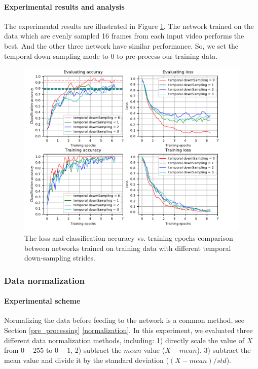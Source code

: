 \paragraph{Experimental results and  analysis}
The experimental results are illustrated in Figure \ref{fig:plot_tds}. The network trained on the data which are evenly sampled 16 frames from each input video performs the best. And the other three network have similar performance. So, we set the temporal down-sampling mode to 0 to pre-process our training data.
\begin{figure}
	\includegraphics[trim=0cm 0cm 0cm 0cm]{fig01/plot_tds.pdf}
	\caption{The loss and classification accuracy vs. training epochs comparison between networks trained on training data with different temporal down-sampling strides.}
	\label{fig:plot_tds}
\end{figure}


\subsubsection{Data normalization}
\paragraph{Experimental scheme}
Normalizing the data before feeding to the network is a common method, see Section \ref{pre_processing} \ref{normalization}. In this experiment, we evaluated three different data normalization methods, including: 1) directly scale the value of \(X\) from \(0-255\) to \(0-1\), 2) subtract the \(mean\) value (\(X-mean\)),  3) subtract the mean value and divide it by the standard deviation (\((X-mean)/std\)).   
